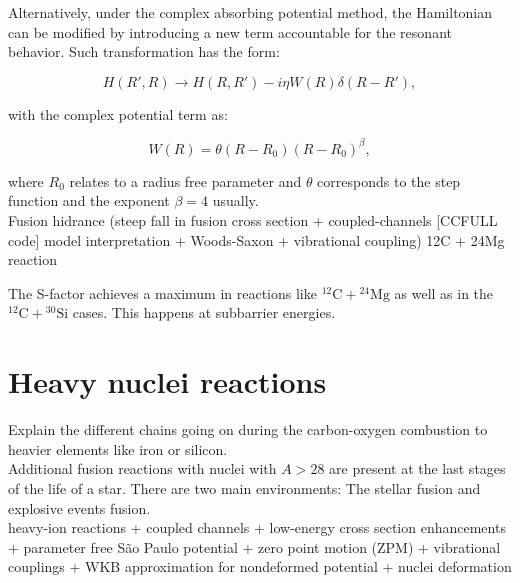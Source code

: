\documentclass[openany]{book}
\begin{document}
Alternatively, under the complex absorbing potential method, the Hamiltonian can be modified by introducing a new term accountable for the resonant behavior. Such transformation has the form: 

\begin{equation}\label{eq:middleFusion_threeBody_resonances_complexAbsorption}
	H(R', R) \rightarrow H(R, R') - i \eta W(R) \delta(R - R'),
\end{equation}

with the complex potential term as: 

\begin{equation}\label{eq:middleFusion_threeBody_resonances_complexAbsorption_potential}
	 W(R) = \theta(R - R_0) (R - R_0)^{\beta},
\end{equation}

where $R_0$ relates to a radius free parameter and $\theta$ corresponds to the step function and the exponent $\beta = 4$ usually. \\

Fusion hidrance (steep fall in fusion cross section + coupled-channels [CCFULL code] model interpretation + Woods-Saxon + vibrational coupling) 12C + 24Mg reaction \cite{montagnoli_stefanini_jiang_colucci_goasduff_brugnara_mazzocco_siciliano_scarlassara_corradi_et_2020} 

The S-factor achieves a maximum in reactions like $\mathrm{{}^{12}C + {}^{24}Mg}$ as well as in the  $\mathrm {{}^{12}C + {}^{30}Si}$ cases. This happens at subbarrier energies.

\section{Heavy nuclei reactions } \label{sec:heavyReactions}

Explain the different chains going on during the carbon-oxygen combustion to heavier elements like iron or silicon. \\

Additional fusion reactions with nuclei with $A > 28$ are present at the last stages of the life of a star. There are two main environments: The stellar fusion and explosive events fusion. \\

heavy-ion reactions + coupled channels + low-energy cross section enhancements  + parameter free São Paulo potential + zero point motion (ZPM) + vibrational couplings + WKB approximation for nondeformed potential  + nuclei deformation \cite{nobre_chamon_gasques_carlson_thompson_2007}
\end{document}
